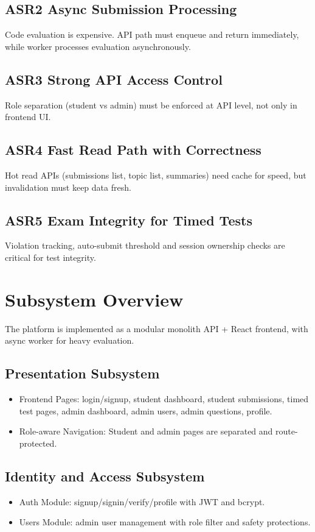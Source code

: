 \documentclass[12pt,journal,onecolumn]{IEEEtran}
\begin{document}
\subsection{ASR2 Async Submission Processing}
Code evaluation is expensive. API path must enqueue and return immediately, while worker processes evaluation asynchronously.

\subsection{ASR3 Strong API Access Control}
Role separation (student vs admin) must be enforced at API level, not only in frontend UI.

\subsection{ASR4 Fast Read Path with Correctness}
Hot read APIs (submissions list, topic list, summaries) need cache for speed, but invalidation must keep data fresh.

\subsection{ASR5 Exam Integrity for Timed Tests}
Violation tracking, auto-submit threshold and session ownership checks are critical for test integrity.

\section{Subsystem Overview}

The platform is implemented as a modular monolith API + React frontend, with async worker for heavy evaluation.

\subsection{Presentation Subsystem}
\begin{itemize}
    \item Frontend Pages: login/signup, student dashboard, student submissions, timed test pages, admin dashboard, admin users, admin questions, profile.
    \item Role-aware Navigation: Student and admin pages are separated and route-protected.
\end{itemize}

\subsection{Identity and Access Subsystem}
\begin{itemize}
    \item Auth Module: signup/signin/verify/profile with JWT and bcrypt.
    \item Users Module: admin user management with role filter and safety protections.
\end{itemize}
\end{document}
